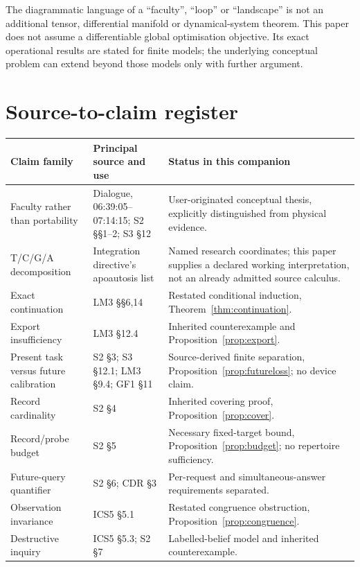 The diagrammatic language of a ``faculty'', ``loop'' or ``landscape'' is not an additional tensor, differential manifold or dynamical-system theorem. This paper does not assume a differentiable global optimisation objective. Its exact operational results are stated for finite models; the underlying conceptual problem can extend beyond those models only with further argument.

\section{Source-to-claim register}
\label{app:source}

\small
\begin{longtable}{@{}p{.20\linewidth}p{.36\linewidth}p{.36\linewidth}@{}}
\toprule
Claim family & Principal source and use & Status in this companion\\
\midrule
\endhead
Faculty rather than portability & Dialogue, 06:39:05--07:14:15; S2 \S\S1--2; S3 \S12 & User-originated conceptual thesis, explicitly distinguished from physical evidence.\\
T/C/G/A decomposition & Integration directive's apoautosis list & Named research coordinates; this paper supplies a declared working interpretation, not an already admitted source calculus.\\
Exact continuation & LM3 \S\S6,14 & Restated conditional induction, Theorem~\ref{thm:continuation}.\\
Export insufficiency & LM3 \S12.4 & Inherited counterexample and Proposition~\ref{prop:export}.\\
Present task versus future calibration & S2 \S3; S3 \S12.1; LM3 \S9.4; GF1 \S11 & Source-derived finite separation, Proposition~\ref{prop:futureloss}; no device claim.\\
Record cardinality & S2 \S4 & Inherited covering proof, Proposition~\ref{prop:cover}.\\
Record/probe budget & S2 \S5 & Necessary fixed-target bound, Proposition~\ref{prop:budget}; no repertoire sufficiency.\\
Future-query quantifier & S2 \S6; CDR \S3 & Per-request and simultaneous-answer requirements separated.\\
Observation invariance & ICS5 \S5.1 & Restated congruence obstruction, Proposition~\ref{prop:congruence}.\\
Destructive inquiry & ICS5 \S5.3; S2 \S7 & Labelled-belief model and inherited counterexample.\\

\end{longtable}
